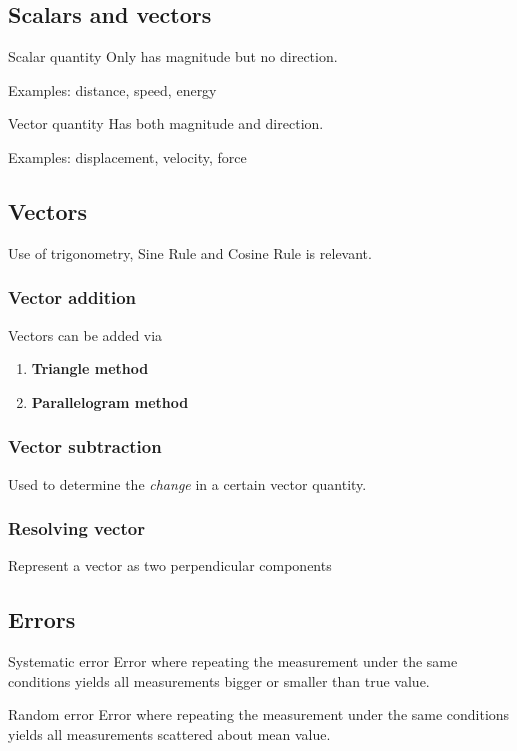 \subsection{Scalars and vectors}
\begin{defn}{Scalar quantity}{}
Only has magnitude but no direction.
\end{defn}
Examples: distance, speed, energy

\begin{defn}{Vector quantity}{}
Has both magnitude and direction.
\end{defn}
Examples: displacement, velocity, force

\subsection{Vectors}
Use of trigonometry, Sine Rule and Cosine Rule is relevant.
\subsubsection{Vector addition}
Vectors can be added via
\begin{enumerate}
\item \textbf{Triangle method}

\item \textbf{Parallelogram method}

\end{enumerate}

\subsubsection{Vector subtraction}
Used to determine the \emph{change} in a certain vector quantity.

\subsubsection{Resolving vector}
Represent a vector as two perpendicular components
\pagebreak

\subsection{Errors}
\begin{defn}{Systematic error}{}
Error where repeating the measurement under the same conditions yields all measurements bigger or smaller than true value. 
\end{defn}

\begin{defn}{Random error}{}
Error where repeating the measurement under the same conditions yields all measurements scattered about mean value.
\end{defn}

